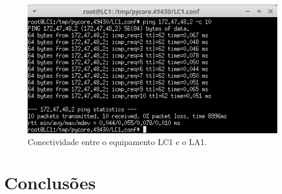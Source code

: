 \documentclass{llncs}
\begin{document}
\begin{figure}[H]
\begin{center}
\includegraphics[scale=0.60]{3_LC1_LA1.png} 
\end{center}
\caption{\label{fig:3_LC1_LA1} Conectividade entre o equipamento LC1 e o LA1.}
\end{figure}

\section{Conclusões}



\end{document}
